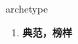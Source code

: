 
\begin{frame}
{\huge archetype}
\begin{center}
\begin{enumerate}\Large
  \item \textbf{典范，榜样}
\end{enumerate}
\end{center}
\end{frame}

